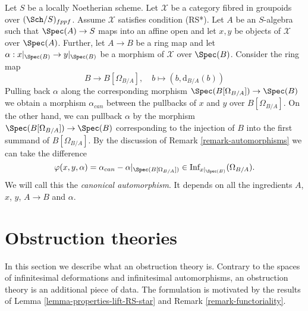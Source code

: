 \begin{remark}
\label{remark-canonical-isomorphism}
Let $S$ be a locally Noetherian scheme. Let $\mathcal{X}$ be a category
fibred in groupoids over $(\Sch/S)_{fppf}$. Assume $\mathcal{X}$ satisfies
condition (RS*). Let $A$ be an $S$-algebra such that
$\Spec(A) \to S$ maps into an affine open and let $x, y$ be objects of
$\mathcal{X}$ over $\Spec(A)$. Further, let $A \to B$ be a ring map and
let $\alpha : x|_{\Spec(B)} \to y|_{\Spec(B)}$ be a morphism of
$\mathcal{X}$ over $\Spec(B)$. Consider the ring map
$$
B \longrightarrow B[\Omega_{B/A}],
\quad
b \longmapsto (b, \text{d}_{B/A}(b))
$$
Pulling back $\alpha$ along the corresponding morphism
$\Spec(B[\Omega_{B/A}]) \to \Spec(B)$ we obtain a
morphism $\alpha_{can}$ between the pullbacks of $x$ and $y$ over
$B[\Omega_{B/A}]$. On the other hand, we can pullback $\alpha$
by the morphism $\Spec(B[\Omega_{B/A}]) \to \Spec(B)$ corresponding
to the injection of $B$ into the first summand of $B[\Omega_{B/A}]$.
By the discussion of Remark \ref{remark-automorphisms}
we can take the difference
$$
\varphi(x, y, \alpha) = \alpha_{can} - \alpha|_{\Spec(B[\Omega_{B/A}])} \in
\text{Inf}_{x|_{\Spec(B)}}(\Omega_{B/A}).
$$
We will call this the {\it canonical automorphism}. It depends
on all the ingredients $A$, $x$, $y$, $A \to B$ and $\alpha$.
\end{remark}





\section{Obstruction theories}
\label{section-obstruction-theory}

\noindent
In this section we describe what an obstruction theory is.
Contrary to the spaces of infinitesimal deformations and infinitesimal
automorphisms, an obstruction theory is an additional piece of data.
The formulation is motivated by the results of
Lemma \ref{lemma-properties-lift-RS-star}
and Remark \ref{remark-functoriality}.

